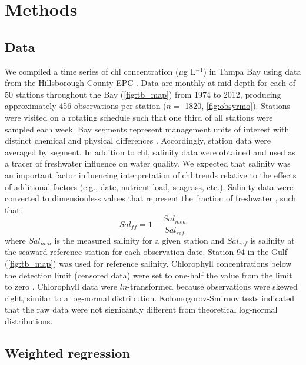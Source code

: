 \documentclass[letterpaper,12pt,oneside]{article}\usepackage{graphicx, color}
\newcommand{\mugl}{$\mu$g L$^{-1}$}
\begin{document}
\section{Methods}

\subsection{Data}

We compiled a time series of \ac{chl} concentration (\mugl) in Tampa Bay using data from the Hillsborough County \ac{EPC} .  Data are monthly at mid-depth for each of 50 stations throughout the Bay (\cref{fig:tb_map}) from 1974 to 2012, producing approximately 456 observations per station ($n=$ 1820, \cref{fig:obsyrmo}).  Stations were visited on a rotating schedule such that one third of all stations were sampled each week.  Bay segments represent management units of interest with distinct chemical and physical differences \citep[\cref{tab:segsum},][]{Lewis85}.  Accordingly, station data were averaged by segment.  In addition to \ac{chl}, salinity data were obtained and used as a tracer of freshwater influence on water quality.  We expected that salinity was an important factor influencing interpretation of \ac{chl} trends relative to the effects of additional factors (e.g., date, nutrient load, seagrass, etc.).  Salinity data were converted to dimensionless values that represent the fraction of freshwater \citep{Dyer73}, such that:
\begin{equation}
Sal_{ff} = 1 - \frac{Sal_{mea}}{Sal_{ref}}
\end{equation}
\noindent where $Sal_{mea}$ is the measured salinity for a given station and $Sal_{ref}$ is salinity at the seaward reference station for each observation date.  Station 94 in the Gulf (\cref{fig:tb_map}) was used for reference salinity.  Chlorophyll concentrations below the detection limit (censored data) were set to one-half the value from the limit to zero \citep{Gilbert87}.  Chlorophyll data were $ln$-transformed because observations were skewed right, similar to a log-normal distribution.  Kolomogorov-Smirnov tests indicated that the raw data were not signicantly different from theoretical log-normal distributions.

\subsection{Weighted regression}
\end{document}
